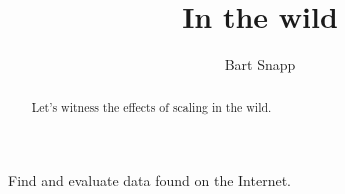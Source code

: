 \documentclass[handout,nooutcomes,noauthor]{ximera}
\title{In the wild}
\author{Bart Snapp}
\begin{document}
\begin{abstract}
  Let's witness the effects of scaling in the wild.
\end{abstract}
\maketitle


\begin{listOutcomes}
\item Find and evaluate data found on the Internet.
\end{listOutcomes}





\mynewpage
\end{document}
